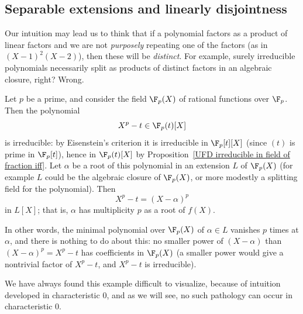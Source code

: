 \subsection{Separable extensions and linearly disjointness}
Our intuition may lead us to think that if a polynomial factors as a product of linear factors and we are not \textit{purposely} repeating one of the factors (as in $(X-1)^2(X-2)$), then these will be \textit{distinct}. For example, surely irreducible polynomials necessarily split as products of distinct factors in an algebraic closure, right? Wrong.
\begin{example}\label{irr insepara eg}
Let $p$ be a prime, and consider the field $\F_p(X)$ of rational functions over $\F_p$. Then the polynomial
\[X^p-t\in \F_p(t)[X]\]
is irreducible: by Eisenstein's criterion it is irreducible in $\F_p[t][X]$ (since $(t)$ is prime in $\F_p[t]$), hence in $\F_p(t)[X]$ by Proposition~\ref{UFD irreducible in field of fraction iff}. Let $\alpha$ be a root of this polynomial in an extension $L$ of $\F_p(X)$ (for example $L$ could be the algebraic closure of $\F_p(X)$, or more modestly a splitting field for the polynomial). Then
\[X^p-t=(X-\alpha)^p\]
in $L[X]$; that is, $\alpha$ has multiplicity $p$ as a root of $f(X)$.\par
In other words, the minimal polynomial over $\F_p(X)$ of $\alpha\in L$ vanishes $p$ times at $\alpha$, and there is nothing to do about this: no smaller power of $(X-\alpha)$ than $(X-\alpha)^p=X^p-t$ has coefficients in $\F_p(X)$ (a smaller power would give a nontrivial factor of $X^p-t$, and $X^p-t$ is irreducible).
\end{example}
We have always found this example difficult to visualize, because of intuition developed in characteristic $0$, and as we will see, no such pathology can occur in characteristic $0$.
